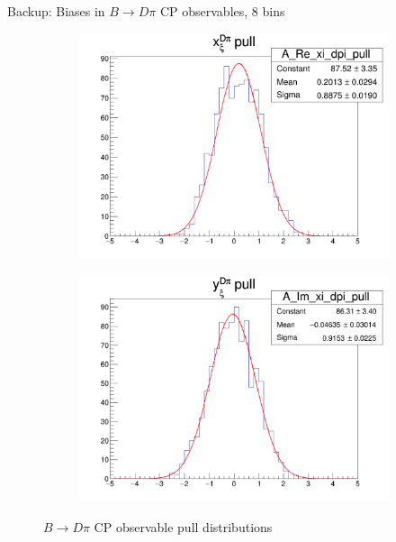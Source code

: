 \documentclass{beamer}
\begin{document}
\begin{frame}{Backup: Biases in $B\to D\pi$ CP observables, $8$ bins}
  \begin{figure}
    \centering
    \vspace{-0.2cm}
    \begin{subfigure}{0.5\textwidth}
      \includegraphics[width = 1.0\textwidth]{A_Re_xi_dpi_8Bins_pull.png}
    \end{subfigure}%
    \begin{subfigure}{0.5\textwidth}
      \includegraphics[width = 1.0\textwidth]{A_Im_xi_dpi_8Bins_pull.png}
    \end{subfigure}
    \caption{$B\to D\pi$ CP observable pull distributions}
  \end{figure}
\end{frame}
\end{document}

